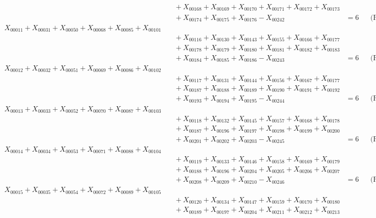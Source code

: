 \documentclass[a4paper,10pt]{article}
\begin{document}
{\begin{align}
&\quad  + X_{00168} + X_{00169} + X_{00170} + X_{00171} + X_{00172} + X_{00173} \\[0.5ex]
&\quad  + X_{00174} + X_{00175} + X_{00176} - X_{00242} &= 6 && \text{(R00011)} \\
X_{00011} + X_{00031} + X_{00050} + X_{00068} + X_{00085} + X_{00101} \\[0.5ex]
&\quad  + X_{00116} + X_{00130} + X_{00143} + X_{00155} + X_{00166} + X_{00177} \\[0.5ex]
&\quad  + X_{00178} + X_{00179} + X_{00180} + X_{00181} + X_{00182} + X_{00183} \\[0.5ex]
&\quad  + X_{00184} + X_{00185} + X_{00186} - X_{00243} &= 6 && \text{(R00012)} \\
X_{00012} + X_{00032} + X_{00051} + X_{00069} + X_{00086} + X_{00102} \\[0.5ex]
&\quad  + X_{00117} + X_{00131} + X_{00144} + X_{00156} + X_{00167} + X_{00177} \\[0.5ex]
&\quad  + X_{00187} + X_{00188} + X_{00189} + X_{00190} + X_{00191} + X_{00192} \\[0.5ex]
&\quad  + X_{00193} + X_{00194} + X_{00195} - X_{00244} &= 6 && \text{(R00013)} \\
X_{00013} + X_{00033} + X_{00052} + X_{00070} + X_{00087} + X_{00103} \\[0.5ex]
&\quad  + X_{00118} + X_{00132} + X_{00145} + X_{00157} + X_{00168} + X_{00178} \\[0.5ex]
&\quad  + X_{00187} + X_{00196} + X_{00197} + X_{00198} + X_{00199} + X_{00200} \\[0.5ex]
&\quad  + X_{00201} + X_{00202} + X_{00203} - X_{00245} &= 6 && \text{(R00014)} \\
X_{00014} + X_{00034} + X_{00053} + X_{00071} + X_{00088} + X_{00104} \\[0.5ex]
&\quad  + X_{00119} + X_{00133} + X_{00146} + X_{00158} + X_{00169} + X_{00179} \\[0.5ex]
&\quad  + X_{00188} + X_{00196} + X_{00204} + X_{00205} + X_{00206} + X_{00207} \\[0.5ex]
&\quad  + X_{00208} + X_{00209} + X_{00210} - X_{00246} &= 6 && \text{(R00015)} \\
X_{00015} + X_{00035} + X_{00054} + X_{00072} + X_{00089} + X_{00105} \\[0.5ex]
&\quad  + X_{00120} + X_{00134} + X_{00147} + X_{00159} + X_{00170} + X_{00180} \\[0.5ex]
&\quad  + X_{00189} + X_{00197} + X_{00204} + X_{00211} + X_{00212} + X_{00213} \\[0.5ex]

\end{align}}
\end{document}
